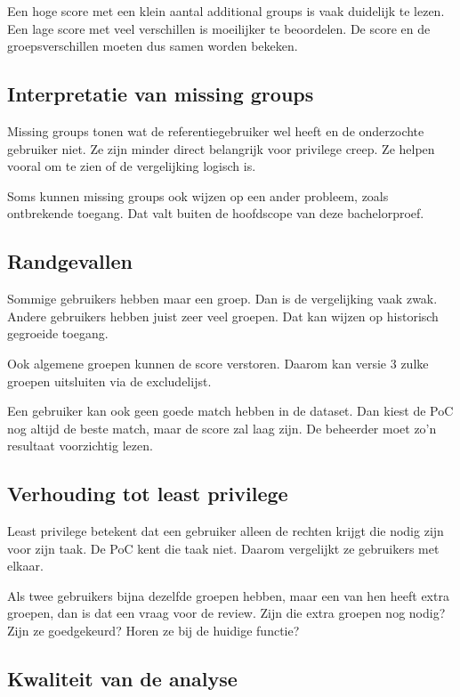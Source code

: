 Een hoge score met een klein aantal additional groups is vaak duidelijk te lezen. Een lage score met veel verschillen is moeilijker te beoordelen. De score en de groepsverschillen moeten dus samen worden bekeken.

\subsection*{Interpretatie van missing groups}

Missing groups tonen wat de referentiegebruiker wel heeft en de onderzochte gebruiker niet. Ze zijn minder direct belangrijk voor privilege creep. Ze helpen vooral om te zien of de vergelijking logisch is.

Soms kunnen missing groups ook wijzen op een ander probleem, zoals ontbrekende toegang. Dat valt buiten de hoofdscope van deze bachelorproef.

\subsection*{Randgevallen}

Sommige gebruikers hebben maar een groep. Dan is de vergelijking vaak zwak. Andere gebruikers hebben juist zeer veel groepen. Dat kan wijzen op historisch gegroeide toegang.

Ook algemene groepen kunnen de score verstoren. Daarom kan versie 3 zulke groepen uitsluiten via de excludelijst.

Een gebruiker kan ook geen goede match hebben in de dataset. Dan kiest de PoC nog altijd de beste match, maar de score zal laag zijn. De beheerder moet zo'n resultaat voorzichtig lezen.

\subsection*{Verhouding tot least privilege}

Least privilege betekent dat een gebruiker alleen de rechten krijgt die nodig zijn voor zijn taak. De PoC kent die taak niet. Daarom vergelijkt ze gebruikers met elkaar.

Als twee gebruikers bijna dezelfde groepen hebben, maar een van hen heeft extra groepen, dan is dat een vraag voor de review. Zijn die extra groepen nog nodig? Zijn ze goedgekeurd? Horen ze bij de huidige functie?

\subsection*{Kwaliteit van de analyse}

